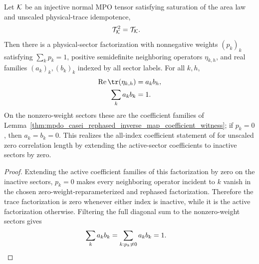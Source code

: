 \begin{theorem}
    \label{thm:mpdo_casei_all_sector_rank_one_coefficients_of_is_sal}
    \leanok
    Let ${\cal K}$ be an injective normal MPO tensor satisfying saturation of
    the area law and unscaled physical-trace idempotence,
    \begin{align}
        \mathcal T_{\cal K}^2 & =\mathcal T_{\cal K}.
        \notag
    \end{align}
    Then there is a physical-sector factorization with nonnegative weights
    $(p_k)_k$ satisfying $\sum_k p_k=1$, positive semidefinite neighboring
    operators $\eta_{k,h}$, and real families $(a_k)_k,(b_k)_k$ indexed by all
    sector labels. For all $k,h$,
    \begin{align}
        \operatorname{Re}\tr(\eta_{k,h}) & =a_kb_h, \notag \\
        \sum_k a_kb_k                    & =1. \notag
    \end{align}
    On the nonzero-weight sectors these are the coefficient families of
    Lemma~\ref{thm:mpdo_casei_rephased_inverse_map_coefficient_witness}; if
    $p_k=0$,
    then $a_k=b_k=0$. This realizes the all-index coefficient statement of
    \cite[Appendix~C.2, Lemma~C.5, lines~1473--1499]{Cirac2016MPDO_arXiv}
    for unscaled zero correlation length by extending the active-sector
    coefficients to inactive sectors by zero.
\end{theorem}

\begin{proof}
    \leanok
    Extending the active coefficient families of this factorization by zero on
    the inactive sectors, $p_k=0$ makes
    every neighboring operator incident to $k$ vanish in the chosen
    zero-weight-reparameterized and rephased factorization. Therefore the trace
    factorization is zero whenever either index is inactive, while it is the
    active factorization otherwise. Filtering the full diagonal sum to the
    nonzero-weight sectors gives
    \begin{align}
        \sum_k a_kb_k
         & =\sum_{k:p_k\ne0}a_kb_k
        =1.
        \notag
    \end{align}
\end{proof}

